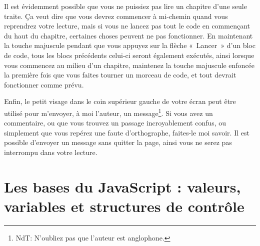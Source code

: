\documentclass{FramateX}
\begin{document}
Il est évidemment possible que vous ne puissiez pas lire un chapitre
d'une seule traite. Ça veut dire que vous devrez commencer à mi-chemin
quand vous reprendrez votre lecture, mais si vous ne lancez pas tout le
code en commençant du haut du chapitre, certaines choses peuvent ne pas
fonctionner. En maintenant la touche majuscule pendant que vous appuyez
sur la flèche «~Lancer~» d'un bloc de code, tous les blocs précédents
celui-ci seront également exécutés, ainsi lorsque vous commencez au
milieu d'un chapitre, maintenez la touche majuscule enfoncée la première
fois que vous faites tourner un morceau de code, et tout devrait
fonctionner comme prévu.

\begin{center}\end{center}

Enfin, le petit visage dans le coin supérieur gauche de votre écran peut
être utilisé pour m'envoyer, à moi l'auteur, un
message\footnote{NdT: N'oubliez pas que l'auteur est anglophone.}. Si vous avez un commentaire, ou que vous
trouvez un passage incroyablement confus, ou simplement que vous repérez
une faute d'orthographe, faites-le moi savoir. Il est possible d'envoyer
un message sans quitter la page, ainsi vous ne serez pas interrompu dans
votre lecture.
     
                    

\mainmatter

                        
%


%

                        
                    

\chapter{Les bases du JavaScript : valeurs, variables et
structures de contrôle}
\end{document}
